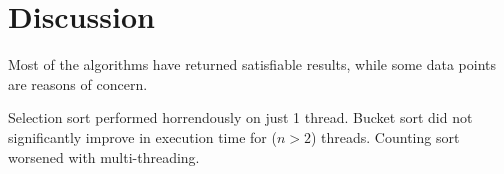 \chapter{Discussion}

Most of the algorithms have returned satisfiable results, while
some data points are reasons of concern.

Selection sort performed horrendously on just 1 thread.
Bucket sort did not significantly improve in execution time for ($n > 2$) threads.
Counting sort worsened with multi-threading.